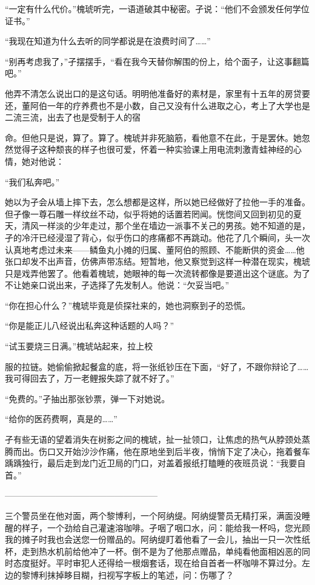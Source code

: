 \documentclass{article}
\begin{document}
“一定有什么代价。”槐琥听完，一语道破其中秘密。孑说：“他们不会颁发任何学位证书。”

“我现在知道为什么去听的同学都说是在浪费时间了……”

“别再考虑我了，”孑摆摆手，“看在我今天替你解围的份上，给个面子，让这事翻篇吧。”

他弄不清怎么说出口的是这句话。明明他准备好的素材是，家里有十五年的房贷要还，董阿伯一年的疗养费也不是小数，自己又没有什么进取之心，考上了大学也是二流三流，出去了也是受制于人的宿

\newpage 

命。但他只是说，算了。算了。槐琥并非死脑筋，看他意不在此，于是罢休。她忽然觉得孑这种颓丧的样子也很可爱，怀着一种实验课上用电流刺激青蛙神经的心情，她对他说：

“我们私奔吧。”

她以为孑会从墙上摔下去，怎么想都是这样，所以她已经做好了拉他一手的准备。但孑像一尊石雕一样纹丝不动，似乎将她的话置若罔闻。恍惚间又回到初见的夏天，清风一样淡的少年走过，那个坐在墙边一派事不关己的男孩。她不知道的是，孑的冷汗已经浸湿了背心，似乎伤口的疼痛都不再跳动。他花了几个瞬间，头一次认真地考虑过未来——鳞鱼丸小摊的归属、董阿伯的照顾、不能断供的资金……他张口却发不出声音，仿佛声带冻结。短暂地，他又察觉到这样一种潜在现实，槐琥只是戏弄他罢了。他看着槐琥，她眼神的每一次流转都像是要道出这个谜底。为了不让她亲口说出来，孑选择了先发制人。他说：“欠妥当吧。”

“你在担心什么？”槐琥毕竟是侦探社来的，她也洞察到孑的恐慌。

“你是能正儿八经说出私奔这种话题的人吗？”

“试玉要烧三日满。”槐琥站起来，拉上校

\newpage 

服的拉链。她偷偷掀起餐盒的底，将一张纸钞压在下面，“好了，不跟你辩论了……我可得回去了，万一老鲤报失踪了就不好了。”

“免费的。”孑抽出那张钞票，弹一下对她说。

“给你的医药费啊，真是的……”

孑有些无语的望着消失在树影之间的槐琥，扯一扯领口，让焦虑的热气从脖颈处蒸腾而出。伤口又开始沙沙作痛，他在原地坐到后半夜，悄悄下定了决心，拖着餐车踽踽独行，最后走到龙门近卫局的门口，对盖着报纸打瞌睡的夜班员说：“我要自首。”

——————————————————

三个警员坐在他对面，两个黎博利，一个阿纳缇。阿纳缇警员无精打采，满面没睡醒的样子，一个劲给自己灌速溶咖啡。孑咽了咽口水，问：能给我一杯吗，您光顾我的摊子时我也会送您一份赠品的。阿纳缇盯着他看了一会儿，抽出一只一次性纸杯，走到热水机前给他冲了一杯。倒不是为了他那点赠品，单纯看他面相凶恶的同时态度挺好。平时审犯人还得给一根烟套话，现在给自首者一杯咖啡不算过分。左边的黎博利抹掉眵目糊，扫视写字板上的笔述，问：伤哪了？
\end{document}
